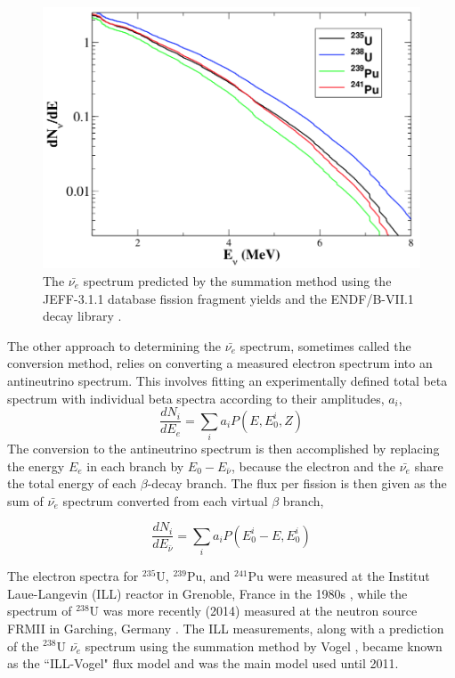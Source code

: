 \begin{figure}[t]
	\centering
	\includegraphics[width=0.65\linewidth]{tex/3-reactorneutrinos-images/Spectrum}
	\caption[The $\bar{\nu_e}$ spectrum.]{The $\bar{\nu_e}$ spectrum predicted by the summation method using the JEFF-3.1.1 database fission fragment yields and the ENDF/B-VII.1 decay library \cite{HayesVogel}.}
	\label{fig:spectrum}
\end{figure}

The other approach to determining the $\bar{\nu_{e}}$ spectrum, sometimes called the conversion method, relies on converting a measured electron spectrum into an antineutrino spectrum. 
This involves fitting an experimentally defined total beta spectrum with individual beta spectra according to their amplitudes, $a_i$, 
\begin{equation}
	\frac{dN_i}{dE_e} = \sum_{i}a_iP(E,E^i_0,Z)
\end{equation}
The conversion to the antineutrino spectrum is then accomplished by replacing the energy $E_e$ in each branch by $E_0 - E_{\bar{\nu}}$, because the electron and the $\bar{\nu_e}$ share the total energy of each $\beta$-decay branch.
The flux per fission is then given as the sum of $\bar{\nu_e}$ spectrum converted from each virtual $\beta$ branch,

\begin{equation}
	\frac{dN_i}{dE_{\bar{\nu}}} = \sum_{i}a_iP(E^i_0-E,E^i_0)
\end{equation}


The electron spectra for $^{235}$U, $^{239}$Pu, and $^{241}$Pu were measured at the Institut
Laue-Langevin (ILL) reactor in Grenoble, France in the 1980s \cite{VonFeilitzsch:1982jw,Schreckenbach:1985ep,Hahn:1989zr}, while the spectrum of $^{238}$U was more recently (2014) measured at the neutron source FRMII in Garching, Germany \cite{Haag:2013raa}.
The ILL measurements, along with a prediction of the $^{238}$U $\bar{\nu_{e}}$ spectrum using the summation method by Vogel \cite{PhysRevC.24.1543}, became known as the ``ILL-Vogel" flux model and was the main model used until 2011.

